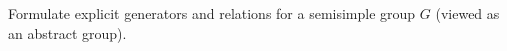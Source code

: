 Formulate explicit generators and relations for a semisimple group $G$ (viewed as an abstract group).
